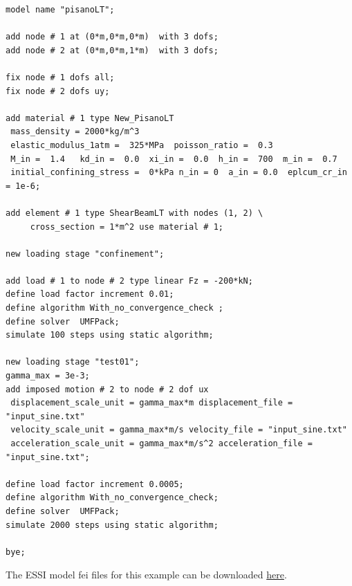 %
\begin{lstlisting}
model name "pisanoLT";

add node # 1 at (0*m,0*m,0*m)  with 3 dofs;
add node # 2 at (0*m,0*m,1*m)  with 3 dofs;

fix node # 1 dofs all;
fix node # 2 dofs uy;

add material # 1 type New_PisanoLT
 mass_density = 2000*kg/m^3
 elastic_modulus_1atm =  325*MPa  poisson_ratio =  0.3
 M_in =  1.4   kd_in =  0.0  xi_in =  0.0  h_in =  700  m_in =  0.7
 initial_confining_stress =  0*kPa n_in = 0  a_in = 0.0  eplcum_cr_in = 1e-6;

add element # 1 type ShearBeamLT with nodes (1, 2) \
     cross_section = 1*m^2 use material # 1;

new loading stage "confinement";

add load # 1 to node # 2 type linear Fz = -200*kN;
define load factor increment 0.01;
define algorithm With_no_convergence_check ;
define solver  UMFPack;
simulate 100 steps using static algorithm;

new loading stage "test01";
gamma_max = 3e-3;
add imposed motion # 2 to node # 2 dof ux
 displacement_scale_unit = gamma_max*m displacement_file = "input_sine.txt"
 velocity_scale_unit = gamma_max*m/s velocity_file = "input_sine.txt"
 acceleration_scale_unit = gamma_max*m/s^2 acceleration_file = "input_sine.txt";

define load factor increment 0.0005;
define algorithm With_no_convergence_check;
define solver  UMFPack;
simulate 2000 steps using static algorithm;

bye;
\end{lstlisting}

The    ESSI   model   fei   files   for   this   example   can   be   downloaded
\href{https://github.com/BorisJeremic/Real-ESSI-Examples/blob/master/model_fei_file/shearbeam_pisano_plastic/shearbeam_pisano_plastic.tgz?raw=true}{here}.


























